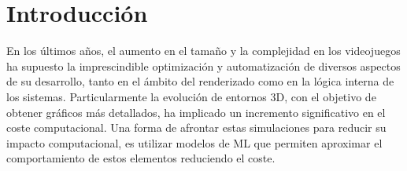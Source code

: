 \chapter{Introducción}
\label{cap:introduccion}

En los últimos años, el aumento en el tamaño y la complejidad en los videojuegos ha supuesto la imprescindible optimización y automatización de diversos aspectos de su desarrollo, tanto en el ámbito del renderizado como en la lógica interna de los sistemas. Particularmente la evolución de entornos 3D, con el objetivo de obtener gráficos más detallados, ha implicado un incremento significativo en el coste computacional. Una forma de afrontar estas simulaciones para reducir su impacto computacional, es utilizar modelos de ML que permiten aproximar el comportamiento de estos elementos reduciendo el coste.\newline

